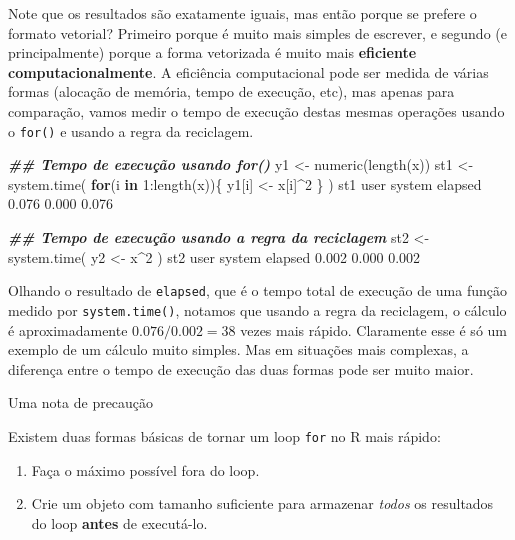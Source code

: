\documentclass[
  10pt,
  a4paper]{book}
\newenvironment{Shaded}{\begin{snugshade}}{\end{snugshade}}
\newcommand{\ControlFlowTok}[1]{\textcolor[rgb]{0.13,0.29,0.53}{\textbf{#1}}}
\newcommand{\DecValTok}[1]{\textcolor[rgb]{0.00,0.00,0.81}{#1}}
\newcommand{\DocumentationTok}[1]{\textcolor[rgb]{0.56,0.35,0.01}{\textbf{\textit{#1}}}}
\newcommand{\FloatTok}[1]{\textcolor[rgb]{0.00,0.00,0.81}{#1}}
\newcommand{\FunctionTok}[1]{\textcolor[rgb]{0.00,0.00,0.00}{#1}}
\newcommand{\NormalTok}[1]{#1}
\newcommand{\OtherTok}[1]{\textcolor[rgb]{0.56,0.35,0.01}{#1}}
\newcommand{\SpecialCharTok}[1]{\textcolor[rgb]{0.00,0.00,0.00}{#1}}
\providecommand{\tightlist}{%
  \setlength{\itemsep}{0pt}\setlength{\parskip}{0pt}}
\begin{document}
Note que os resultados são exatamente iguais, mas então porque se
prefere o formato vetorial? Primeiro porque é muito mais simples de
escrever, e segundo (e principalmente) porque a forma vetorizada é
muito mais \textbf{eficiente computacionalmente}. A eficiência computacional
pode ser medida de várias formas (alocação de memória, tempo de
execução, etc), mas apenas para comparação, vamos medir o tempo de
execução destas mesmas operações usando o \texttt{for()} e usando a regra da
reciclagem.

\begin{Shaded}
\begin{Highlighting}[]
\DocumentationTok{\#\# Tempo de execução usando for()}
\NormalTok{y1 }\OtherTok{\textless{}{-}} \FunctionTok{numeric}\NormalTok{(}\FunctionTok{length}\NormalTok{(x))}
\NormalTok{st1 }\OtherTok{\textless{}{-}} \FunctionTok{system.time}\NormalTok{(}
    \ControlFlowTok{for}\NormalTok{(i }\ControlFlowTok{in} \DecValTok{1}\SpecialCharTok{:}\FunctionTok{length}\NormalTok{(x))\{}
\NormalTok{        y1[i] }\OtherTok{\textless{}{-}}\NormalTok{ x[i]}\SpecialCharTok{\^{}}\DecValTok{2}
\NormalTok{    \}}
\NormalTok{)}
\NormalTok{st1}
\NormalTok{   user  system elapsed }
  \FloatTok{0.076}   \FloatTok{0.000}   \FloatTok{0.076} 

\DocumentationTok{\#\# Tempo de execução usando a regra da reciclagem}
\NormalTok{st2 }\OtherTok{\textless{}{-}} \FunctionTok{system.time}\NormalTok{(}
\NormalTok{    y2 }\OtherTok{\textless{}{-}}\NormalTok{ x}\SpecialCharTok{\^{}}\DecValTok{2}
\NormalTok{)}
\NormalTok{st2}
\NormalTok{   user  system elapsed }
  \FloatTok{0.002}   \FloatTok{0.000}   \FloatTok{0.002} 
\end{Highlighting}
\end{Shaded}

Olhando o resultado de \texttt{elapsed}, que é o tempo total de execução de uma
função medido por \texttt{system.time()}, notamos que usando a regra da
reciclagem, o cálculo é aproximadamente
\(0.076/0.002 = 38\) vezes mais rápido.
Claramente esse é só um exemplo de um cálculo muito simples. Mas em
situações mais complexas, a diferença entre o tempo de execução das duas
formas pode ser muito maior.

Uma nota de precaução

Existem duas formas básicas de tornar um loop \texttt{for} no R mais rápido:

\begin{enumerate}
\def\labelenumi{\arabic{enumi}.}
\tightlist
\item
  Faça o máximo possível fora do loop.
\item
  Crie um objeto com tamanho suficiente para armazenar \emph{todos} os
  resultados do loop \textbf{antes} de executá-lo.
\end{enumerate}
\end{document}
